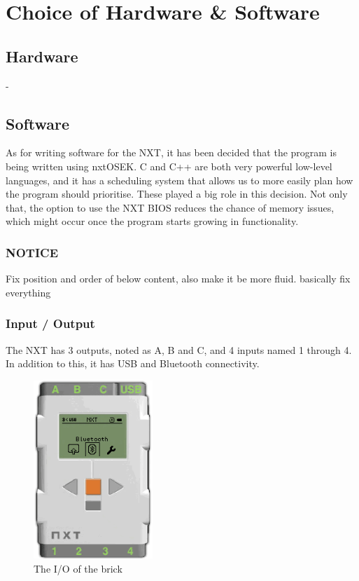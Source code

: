 \section{Choice of Hardware \& Software}

\subsection*{Hardware}
-


\subsection*{Software}
As for writing software for the NXT, it has been decided that the program is being written using nxtOSEK. C and C++ are both very powerful low-level languages, and it has a scheduling system that allows us to more easily plan how the program should prioritise. These played a big role in this decision. Not only that, the option to use the NXT BIOS reduces the chance of memory issues, which might occur once the program starts growing in functionality.

\subsubsection*{NOTICE}
Fix position and order of below content, also make it be more fluid. basically fix everything

\subsubsection*{Input / Output}
The NXT has 3 outputs, noted as A, B and C, and 4 inputs named 1 through 4. In addition to this, it has USB and Bluetooth connectivity.

\begin{figure}[H]
    \label{software_nxtbrick}
    \centering
    \includegraphics[width=0.4\textwidth]{Images/Software/NXT/nxtbrick.png}
    \caption{The I/O of the brick}
\end{figure}

